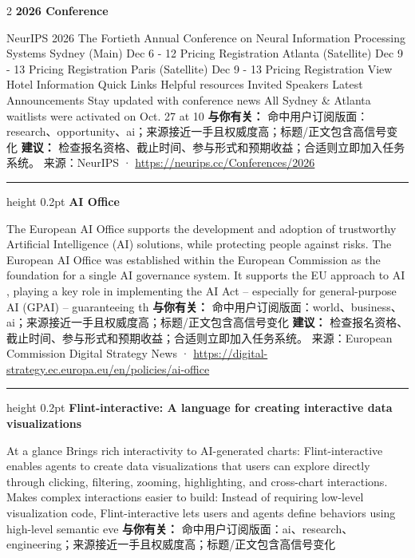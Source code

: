 \documentclass[10.5pt]{ctexart}
\begin{document}
\begin{multicols}{2}
{\large\bfseries 2026 Conference}\par
NeurIPS 2026 The Fortieth Annual Conference on Neural Information Processing Systems Sydney (Main) Dec 6 - 12 Pricing Registration Atlanta (Satellite) Dec 9 - 13 Pricing Registration Paris (Satellite) Dec 9 - 13 Pricing Registration View Hotel Information Quick Links Helpful resources Invited Speakers Latest Announcements Stay updated with conference news All Sydney \& Atlanta waitlists were activated on Oct. 27 at 10
\textbf{与你有关：} 命中用户订阅版面：research、opportunity、ai；来源接近一手且权威度高；标题/正文包含高信号变化
\textbf{建议：} 检查报名资格、截止时间、参与形式和预期收益；合适则立即加入任务系统。
{\footnotesize\color{ormuted} 来源：NeurIPS · \url{https://neurips.cc/Conferences/2026}}
\vspace{2mm}
\hrule height 0.2pt
\vspace{2mm}
{\large\bfseries AI Office}\par
The European AI Office supports the development and adoption of trustworthy Artificial Intelligence (AI) solutions, while protecting people against risks. The European AI Office was established within the European Commission as the foundation for a single AI governance system. It supports the EU approach to AI , playing a key role in implementing the AI Act – especially for general-purpose AI (GPAI) – guaranteeing th
\textbf{与你有关：} 命中用户订阅版面：world、business、ai；来源接近一手且权威度高；标题/正文包含高信号变化
\textbf{建议：} 检查报名资格、截止时间、参与形式和预期收益；合适则立即加入任务系统。
{\footnotesize\color{ormuted} 来源：European Commission Digital Strategy News · \url{https://digital-strategy.ec.europa.eu/en/policies/ai-office}}
\vspace{2mm}
\hrule height 0.2pt
\vspace{2mm}
{\large\bfseries Flint-interactive: A language for creating interactive data visualizations}\par
At a glance Brings rich interactivity to AI-generated charts: Flint-interactive enables agents to create data visualizations that users can explore directly through clicking, filtering, zooming, highlighting, and cross-chart interactions. Makes complex interactions easier to build: Instead of requiring low-level visualization code, Flint-interactive lets users and agents define behaviors using high-level semantic eve
\textbf{与你有关：} 命中用户订阅版面：ai、research、engineering；来源接近一手且权威度高；标题/正文包含高信号变化

\end{multicols}
\end{document}
